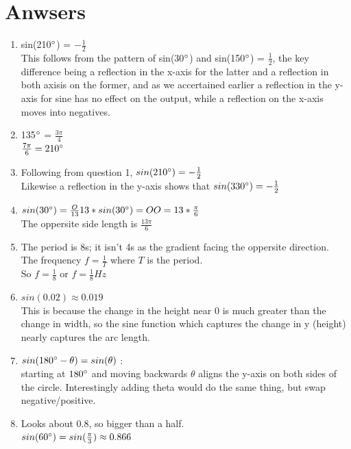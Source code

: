 \documentclass{article}
\begin{document}
\section{Anwsers}
\begin{enumerate}
  \item sin(210$\degree$) = $-\frac{1}{2}$\\This follows from the pattern of sin(30$\degree$) and sin(150$\degree$) = $\frac{1}{2}$, the key difference being a reflection in the x-axis for the latter and a reflection in both axisis on the former, and as we accertained earlier a reflection in the y-axis for sine has no effect on the output, while a reflection on the x-axis moves into negatives.
  \item 135$\degree$ = $\frac{3\pi}{4}$ \\$\frac{7\pi}{6} = 210\degree$
  \item Following from question 1, $sin(210\degree) = -\frac{1}{2}$ \\Likewise a reflection in the y-axis shows that $sin(330\degree) = -\frac{1}{2}$ 
  \item $sin(30\degree) = \frac{O}{13} \\ 13*sin(30\degree) = O \\ O = 13*\frac{\pi}{6}$ \\ The oppersite side length is $\frac{13\pi}{6}$
  \item The period is 8s; it isn't 4s as the gradient facing the oppersite direction. \\ The frequency $f = \frac{1}{T}$ where $T$ is the period. \\ So $f = \frac{1}{8}$ or $f = \frac{1}{8}Hz$
  \item $sin(0.02) \approx 0.019$ \\ This is because the change in the height near 0 is much greater than the change in width, so the sine function which captures the change in y (height) nearly captures the arc length. 
  \item $sin(180\degree - \theta) = sin(\theta)$ : \\ starting at $180\degree$ and moving backwards $\theta$ aligns the y-axis on both sides of the circle. Interestingly adding theta would do the same thing, but swap negative/positive.
  \item Looks about 0.8, so bigger than a half. \\ $sin(60\degree) = sin(\frac{\pi}{3}) \approx 0.866$
\end{enumerate}
\end{document}
